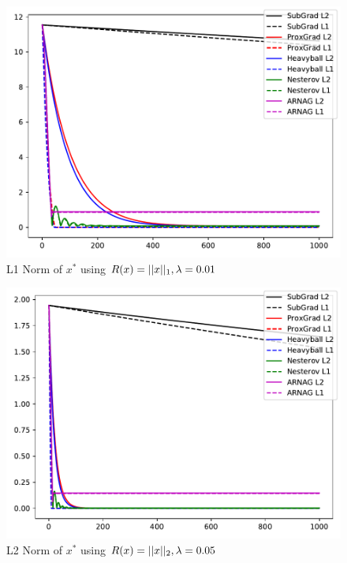 \documentclass[11pt, answers]{exam}
\begin{document}
		\begin{figure}[H]
		\centering
		\includegraphics[width=.75\textwidth]{../out/01xl1.pdf}
		\caption{L1 Norm of $x^*$ using $R(x)=|| x ||_1,\lambda=0.01$}
		\end{figure}		\begin{figure}[H]
		\centering
		\includegraphics[width=.75\textwidth]{../out/05xl2.pdf}
		\caption{L2 Norm of $x^*$ using $R(x)=|| x ||_2,\lambda=0.05$}
		\end{figure}
\end{document}
